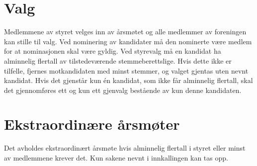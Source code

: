 \section{Valg}
Medlemmene av styret velges inn av årsmøtet og alle medlemmer av foreningen kan stille til valg. Ved nominering av kandidater må den nominerte være medlem for at nominasjonen skal være gyldig. Ved styrevalg må en kandidat ha alminnelig flertall av tilstedeværende stemmeberettslige. Hvis dette ikke er tilfelle, fjernes motkandidaten med minst stemmer, og valget gjentas uten nevnt kandidat. Hvis det gjenstår kun én kandidat, som ikke får alminnelig flertall, skal det gjennomføres ett og kun ett gjenvalg bestående av kun denne kandidaten.

\section{Ekstraordinære årsmøter}
Det avholdes ekstraordinært årsmøte hvis alminnelig flertall i styret eller minst  av medlemmene krever det. Kun sakene nevnt i innkallingen kan tas opp.
